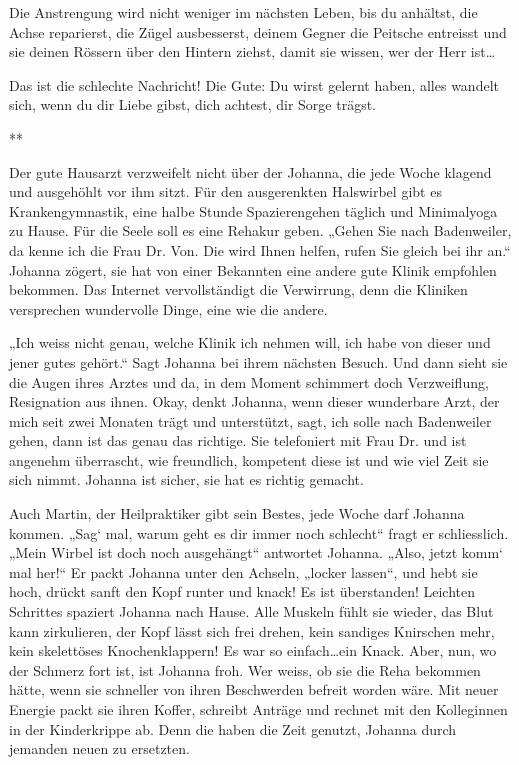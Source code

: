 \documentclass[10pt,titlepage,a5paper]{book}
\newcommand{\sterne}{\par{\centering ***\par}}
\begin{document}
Die Anstrengung wird nicht weniger im nächsten Leben, bis du anhältst, die Achse reparierst, die Zügel ausbesserst, deinem Gegner die Peitsche entreisst und sie deinen Rössern über den Hintern ziehst, damit sie wissen, wer der Herr ist\dots 

Das ist die schlechte Nachricht! Die Gute: Du wirst gelernt haben, alles wandelt sich, wenn du dir Liebe gibst, dich achtest, dir Sorge trägst.

\sterne

Der gute Hausarzt verzweifelt nicht über der Johanna, die jede Woche klagend und ausgehöhlt vor ihm sitzt. Für den ausgerenkten Halswirbel gibt es Krankengymnastik, eine halbe Stunde Spazierengehen täglich und Minimalyoga zu Hause. Für die Seele soll es eine Rehakur geben. „Gehen Sie nach Badenweiler, da kenne ich die Frau Dr. Von. Die wird Ihnen helfen, rufen Sie gleich bei ihr an.“ Johanna zögert, sie hat von einer Bekannten eine andere gute Klinik empfohlen bekommen. Das Internet vervollständigt die Verwirrung, denn die Kliniken versprechen wundervolle Dinge, eine wie die andere.

„Ich weiss nicht genau, welche Klinik ich nehmen will, ich habe von dieser und jener gutes gehört.“ Sagt  Johanna bei ihrem nächsten Besuch. Und dann sieht sie die Augen ihres Arztes und da, in dem Moment schimmert doch Verzweiflung, Resignation aus ihnen. Okay, denkt Johanna, wenn dieser wunderbare Arzt, der mich seit zwei Monaten trägt und unterstützt, sagt, ich solle nach Badenweiler gehen, dann ist das genau das richtige. Sie telefoniert mit Frau Dr. und ist angenehm überrascht, wie freundlich, kompetent diese ist und wie viel Zeit sie sich nimmt. Johanna ist sicher, sie hat es richtig gemacht.

Auch Martin, der Heilpraktiker gibt sein Bestes, jede Woche darf Johanna kommen. „Sag` mal, warum geht es dir immer noch schl\-echt“ fragt er schliesslich. „Mein Wirbel ist doch noch ausgehängt“ antwortet Johanna. „Also, jetzt komm` mal her!“ Er packt Johanna unter den Achseln, „locker lassen“, und hebt sie hoch, drückt sanft den Kopf runter und knack! Es ist überstanden! Leichten Schrittes spaziert Johanna nach Hause. Alle Muskeln fühlt sie wieder, das Blut kann zirkulieren, der Kopf lässt sich frei drehen, kein sandiges Knirschen mehr, kein skelettöses Knochenklappern!
Es war so einfach\dots  ein Knack. Aber, nun, wo der Schmerz fort ist, ist Johanna froh. Wer weiss, ob sie die Reha bekommen hätte, wenn sie schneller von ihren Beschwerden befreit worden wäre. Mit neuer Energie packt sie ihren Koffer, schreibt Anträge und rechnet mit den Kolleginnen in der Kinderkrippe ab. Denn die haben die Zeit genutzt, Johanna durch jemanden neuen zu ersetzten. 
\end{document}
